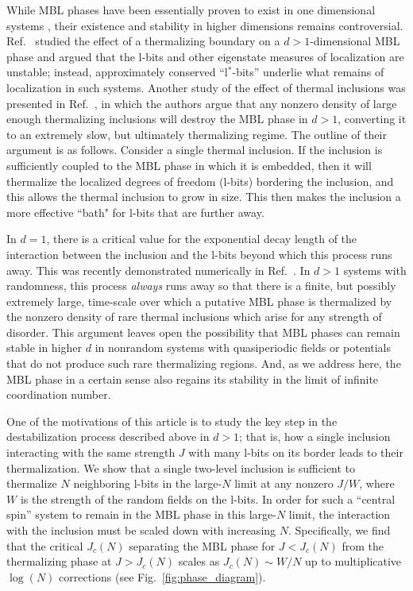 \documentclass[aps,pra,twocolumn,a4paper,showpacs,superscriptaddress,floatfix,10pt]{revtex4}
\begin{document}
While MBL phases have been essentially proven to exist in one dimensional systems \cite{Imbrie2016}, their existence and stability in higher dimensions remains controversial.
Ref.~\cite{Chandran:2016ac} studied the effect of a thermalizing boundary on a $d>1$-dimensional MBL phase and argued that the l-bits and other eigenstate measures of localization are unstable; instead, approximately conserved ``l$^*$-bits'' underlie what remains of localization in such systems.
Another study of the effect of thermal inclusions was presented in Ref.~\cite{De-Roeck:2017aa}, in which the authors argue that any nonzero density of large enough thermalizing inclusions will destroy the MBL phase in $d>1$, converting it to an extremely slow, but ultimately thermalizing regime.
The outline of their argument is as follows.
Consider a single thermal inclusion. If the inclusion is sufficiently coupled to the MBL phase in which it is embedded, then it will thermalize the localized degrees of freedom (l-bits) bordering the inclusion, and this allows the thermal inclusion to grow in size.
This then makes the inclusion a more effective ``bath" for l-bits that are further away.

In $d=1$, there is a critical value for the exponential decay length of the interaction between the inclusion and the l-bits beyond which this process runs away.
This was recently demonstrated numerically in Ref.~\cite{Luitz:2017aa}.
In $d>1$ systems with randomness, this process \emph{always} runs away so that there is a finite, but possibly extremely large, time-scale over which a putative MBL phase is thermalized by the nonzero density of rare thermal inclusions which arise for any strength of disorder.
%
This argument leaves open the possibility that MBL phases can remain stable in higher $d$ in nonrandom systems with quasiperiodic fields or potentials that do not produce such rare thermalizing regions.
And, as we address here, the MBL phase in a certain sense also regains its stability in the limit of infinite coordination number.

One of the motivations of this article is to study the key step in the destabilization process described above in $d>1$; that is, how a single inclusion interacting with the same strength $J$ with many l-bits on its border leads to their thermalization.
We show that a single two-level inclusion is sufficient to thermalize $N$ neighboring l-bits in the large-$N$ limit at any nonzero $J/W$, where $W$ is the strength of the random fields on the l-bits.
In order for such a ``central spin'' system to remain in the MBL phase in this large-$N$ limit, the interaction with the inclusion must be scaled down with increasing $N$.
Specifically, we find that the critical $J_{c}(N)$ separating the MBL phase for $J<J_{c}(N)$ from the thermalizing phase at $J>J_c(N)$ scales as $J_c(N) \sim W/N$ up to multiplicative $\log(N)$ corrections (see Fig.~\ref{fig:phase_diagram}).
\end{document}
